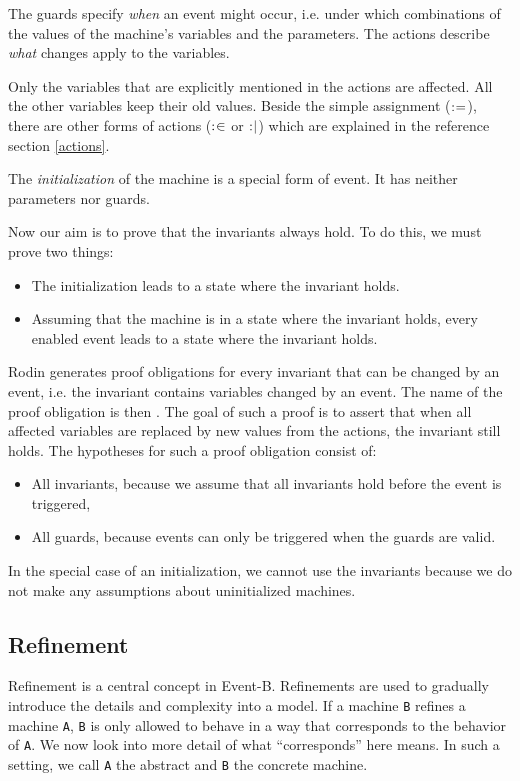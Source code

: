 The guards specify \emph{when} an event might occur, i.e. under which combinations
of the values of the machine's variables and the parameters.
The actions describe \emph{what} changes apply to the variables.

Only the variables that are explicitly mentioned in the actions are affected.
All the other variables keep their old values. Beside the simple assignment ($\mathrel{:\mkern1mu=}$),
there are other forms of actions ($\mathrel{:\mkern1mu\in}$ or $\mathrel{:\mkern1mu\mid}$) which are explained in
the reference section \ref{actions}.

The \emph{initialization} of the machine is a special form of event. It has neither parameters
nor guards.

Now our aim is to prove that the invariants always hold. To do this, we must prove two things:
\begin{itemize}
  \item The initialization leads to a state where the invariant holds.
  \item Assuming that the machine is in a state where the invariant holds,
    every enabled event leads to a state where the invariant holds.
\end{itemize}

Rodin generates proof obligations for every invariant that can be changed by an event, i.e. the invariant contains variables changed by an event.
The name of the proof obligation is then .
The goal of such a proof is to assert that when all affected variables are replaced by new values from the actions, the invariant still holds. The hypotheses for such a proof obligation consist of:

\begin{itemize}

\item All invariants, because we assume that all invariants hold before the event is triggered,
\item All guards, because events can only be triggered when the guards are valid.
\end{itemize}

In the special case of an initialization, we cannot use the invariants because we do not
make any assumptions about uninitialized machines.

\subsection{Refinement}
\label{tutorial:refinement}
Refinement is a central concept in Event-B. Refinements are used to gradually
introduce the details and complexity into a model.
If a machine \texttt{B} refines a machine \texttt{A}, \texttt{B} is only allowed to behave in a way that
corresponds to the behavior of \texttt{A}. We now look into more detail of what ``corresponds''
here means.
In such a setting, we call \texttt{A} the abstract and \texttt{B} the concrete machine.

